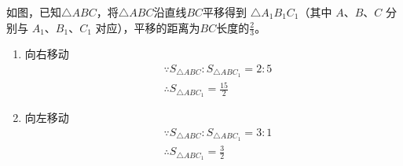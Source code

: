 \documentclass[answers]{exam} %
\newcommand\epart{\part}
\begin{document}
\begin{questions}
\question
  如图，已知$\triangle ABC$，将$\triangle ABC$沿直线$BC$平移得到
  $\triangle A_1B_1C_1$（其中 $A$、$B$、$C$ 分别与 $A_1$、$B_1$、$C_1$
  对应），平移的距离为$BC$长度的$\frac{2}{3}$。

\begin{center}
\end{center}


  \vspace*{1in}
  \begin{solution}
    \begin{enumerate}
    \item 向右移动
      \[
        \begin{aligned}
          & \because S_{\triangle ABC} : S_{\triangle ABC_{1}}  = 2 : 5 \\
          & \therefore S_{\triangle ABC_1} = \frac{15}{2}
        \end{aligned}
      \]
    \item 向左移动
      \[
        \begin{aligned}
          & \because S_{\triangle ABC} : S_{\triangle ABC_{1}}  = 3 : 1 \\
          & \therefore S_{\triangle ABC_1} = \frac{3}{2}
        \end{aligned}
      \]
    \end{enumerate}
  \end{solution}

\end{questions}
\end{document}
